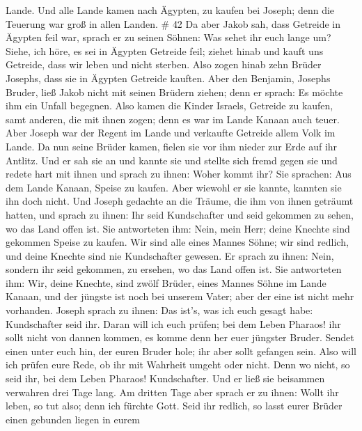 Lande.  Und alle Lande kamen nach Ägypten, zu kaufen bei
Joseph; denn die Teuerung war groß in allen Landen. \# 42 
Da aber Jakob sah, dass Getreide in Ägypten feil war, sprach er zu
seinen Söhnen: Was sehet ihr euch lange um?  Siehe, ich
höre, es sei in Ägypten Getreide feil; ziehet hinab und kauft uns
Getreide, dass wir leben und nicht sterben.  Also zogen
hinab zehn Brüder Josephs, dass sie in Ägypten Getreide kauften.
 Aber den Benjamin, Josephs Bruder, ließ Jakob nicht mit
seinen Brüdern ziehen; denn er sprach: Es möchte ihm ein Unfall
begegnen.  Also kamen die Kinder Israels, Getreide zu
kaufen, samt anderen, die mit ihnen zogen; denn es war im Lande Kanaan
auch teuer.  Aber Joseph war der Regent im Lande und
verkaufte Getreide allem Volk im Lande. Da nun seine Brüder kamen,
fielen sie vor ihm nieder zur Erde auf ihr Antlitz.  Und er
sah sie an und kannte sie und stellte sich fremd gegen sie und redete
hart mit ihnen und sprach zu ihnen: Woher kommt ihr? Sie sprachen: Aus
dem Lande Kanaan, Speise zu kaufen.  Aber wiewohl er sie
kannte, kannten sie ihn doch nicht.  Und Joseph gedachte an
die Träume, die ihm von ihnen geträumt hatten, und sprach zu ihnen: Ihr
seid Kundschafter und seid gekommen zu sehen, wo das Land offen ist.
 Sie antworteten ihm: Nein, mein Herr; deine Knechte sind
gekommen Speise zu kaufen.  Wir sind alle eines Mannes
Söhne; wir sind redlich, und deine Knechte sind nie Kundschafter
gewesen.  Er sprach zu ihnen: Nein, sondern ihr seid
gekommen, zu ersehen, wo das Land offen ist.  Sie
antworteten ihm: Wir, deine Knechte, sind zwölf Brüder, eines Mannes
Söhne im Lande Kanaan, und der jüngste ist noch bei unserem Vater; aber
der eine ist nicht mehr vorhanden.  Joseph sprach zu ihnen:
Das ist's, was ich euch gesagt habe: Kundschafter seid ihr.
 Daran will ich euch prüfen; bei dem Leben Pharaos! ihr
sollt nicht von dannen kommen, es komme denn her euer jüngster Bruder.
 Sendet einen unter euch hin, der euren Bruder hole; ihr
aber sollt gefangen sein. Also will ich prüfen eure Rede, ob ihr mit
Wahrheit umgeht oder nicht. Denn wo nicht, so seid ihr, bei dem Leben
Pharaos! Kundschafter.  Und er ließ sie beisammen verwahren
drei Tage lang.  Am dritten Tage aber sprach er zu ihnen:
Wollt ihr leben, so tut also; denn ich fürchte Gott.  Seid
ihr redlich, so lasst eurer Brüder einen gebunden liegen in eurem
